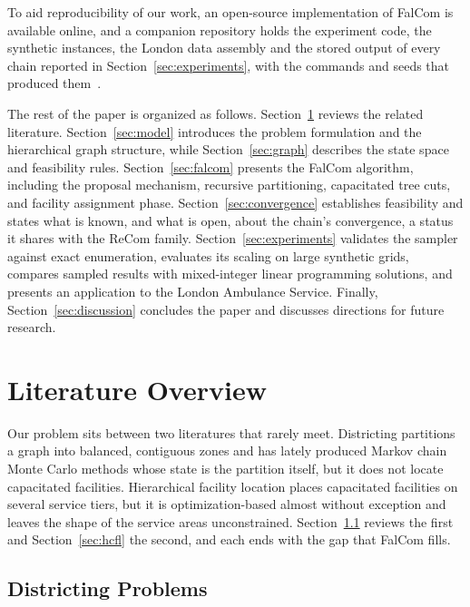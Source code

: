 \documentclass[preprint,12pt,authoryear]{elsarticle}
\theoremstyle{definition}
\begin{document}
To aid reproducibility of our work, an open-source implementation of FalCom is available online, and a companion repository holds the experiment code, the synthetic instances, the London data assembly and the stored output of every chain reported in Section~\ref{sec:experiments}, with the commands and seeds that produced them~\citep{falcomchain}.


The rest of the paper is organized as follows.
Section~\ref{sec:literature} reviews the related literature. Section~\ref{sec:model} 
introduces the problem formulation and the hierarchical graph structure, while 
Section~\ref{sec:graph} describes the state space and feasibility rules. 
Section~\ref{sec:falcom} presents the FalCom algorithm, including the proposal 
mechanism, recursive partitioning, capacitated tree cuts, and facility assignment 
phase. Section~\ref{sec:convergence} establishes feasibility and states what is known, and what is open, about the chain's convergence, a status it shares with the ReCom family. Section~\ref{sec:experiments} 
validates the sampler against exact enumeration, evaluates its scaling on large 
synthetic grids, compares sampled results with mixed-integer linear programming 
solutions, and presents an application to the London 
Ambulance Service. Finally, Section~\ref{sec:discussion} 
concludes the paper and discusses directions for future research.



\section{Literature Overview}
\label{sec:literature}

Our problem sits between two literatures that rarely meet. Districting partitions a graph into balanced, contiguous zones and has lately produced Markov chain Monte Carlo methods whose state is the partition itself, but it does not locate capacitated facilities. Hierarchical facility location places capacitated facilities on several service tiers, but it is optimization-based almost without exception and leaves the shape of the service areas unconstrained. Section~\ref{sec:lit-districting} reviews the first and Section~\ref{sec:hcfl} the second, and each ends with the gap that FalCom fills.

\subsection{Districting Problems}
\label{sec:lit-districting}
\end{document}
